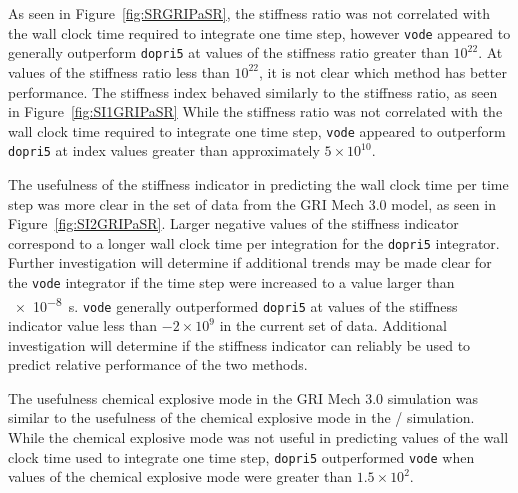 \documentclass[12pt]{ussci}
\begin{document}
As seen in Figure~\ref{fig:SRGRIPaSR}, the stiffness ratio was not correlated with the wall clock time required to integrate one time step, however \texttt{vode} appeared to generally outperform \texttt{dopri5} at values of the stiffness ratio greater than $10^{22}$.
At values of the stiffness ratio less than $10^{22}$, it is not clear which method has better performance.
The stiffness index behaved similarly to the stiffness ratio, as seen in Figure~\ref{fig:SI1GRIPaSR}
While the stiffness ratio was not correlated with the wall clock time required to integrate one time step, \texttt{vode} appeared to outperform \texttt{dopri5} at index values greater than approximately $5 \times 10^{10}$.

The usefulness of the stiffness indicator in predicting the wall clock time per time step was more clear in the set of data from the GRI Mech 3.0 model, as seen in Figure~\ref{fig:SI2GRIPaSR}.
Larger negative values of the stiffness indicator correspond to a longer wall clock time per integration for the \texttt{dopri5} integrator.
Further investigation will determine if additional trends may be made clear for the \texttt{vode} integrator if the time step were increased to a value larger than \SI{e-8}{\second}.
\texttt{vode} generally outperformed \texttt{dopri5} at values of the stiffness indicator value less than $-2 \times 10^{9}$ in the current set of data.
Additional investigation will determine if the stiffness indicator can reliably be used to predict relative performance of the two methods.

The usefulness chemical explosive mode in the GRI Mech 3.0 simulation was similar to the usefulness of the chemical explosive mode in the \slash {} simulation.
While the chemical explosive mode was not useful in predicting values of the wall clock time used to integrate one time step, \texttt{dopri5} outperformed \texttt{vode} when values of the chemical explosive mode were greater than $1.5 \times 10^2$.
\end{document}
